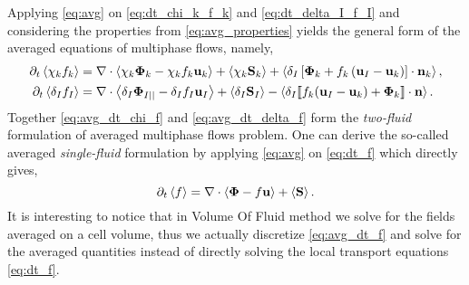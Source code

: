 Applying \ref{eq:avg} on \ref{eq:dt_chi_k_f_k} and \ref{eq:dt_delta_I_f_I} and considering the properties from \ref{eq:avg_properties} yields the general form of the averaged equations of multiphase flows, namely,
\begin{align}
    \partial_t \left<\chi_k f_k\right>
    &= \mathbf{\nabla} \cdot \left<\chi_k \mathbf{\Phi}_k - \chi_k f_k \textbf{u}_k\right>
    + \left<\chi_k \textbf{S}_k\right>
    + \left<\delta_I\left[
        \mathbf{\Phi}_k
        + f_k
        \left(
            \textbf{u}_I
            - \textbf{u}_k
        \right)
    \right]
    \cdot \textbf{n}_k\right> ,
    \label{eq:avg_dt_chi_f}\\
    \partial_t \left<\delta_If_I\right>
    &= 
    \mathbf{\nabla} \cdot \left<\delta_I \mathbf{\Phi}_{I||} - \delta_I f_I \textbf{u}_I\right>
    +\left<\delta_I\textbf{S}_I\right> 
    - \left<\delta_I \llbracket 
    f_k (\textbf{u}_I - \textbf{u}_k)
    + \mathbf{\Phi}_k
     \rrbracket \cdot \textbf{n} \right>.
    \label{eq:avg_dt_delta_f}
\end{align}
Together \ref{eq:avg_dt_chi_f}  and \ref{eq:avg_dt_delta_f} form the \textit{two-fluid} formulation of averaged multiphase flows problem. 
One can derive the so-called averaged \textit{single-fluid} formulation by applying \ref{eq:avg} on \ref{eq:dt_f} which directly gives, 
\begin{equation}
    \partial_t \left<f\right>
    = \mathbf{\nabla} \cdot \left<\mathbf{\Phi} - f \textbf{u}\right>
    + \left<\textbf{S}\right>.
    \label{eq:avg_dt_f}
\end{equation}
It is interesting to notice that in Volume Of Fluid method we solve for the fields averaged on a cell volume, thus we actually discretize \ref{eq:avg_dt_f} and solve for the averaged quantities \citep{popinet2018numerical,tryggvason2011direct} instead of directly solving the local transport equations \ref{eq:dt_f}.

